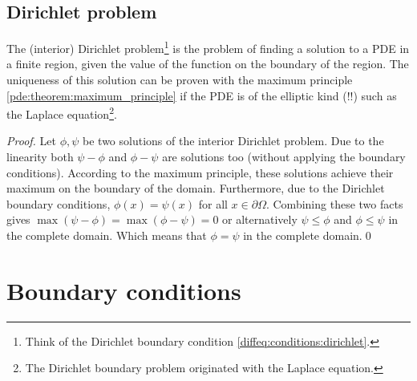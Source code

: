 \subsection{Dirichlet problem}

    The (interior) Dirichlet problem\footnote{Think of the Dirichlet boundary condition \ref{diffeq:conditions:dirichlet}.} is the problem of finding a solution to a PDE in a finite region, given the value of the function on the boundary of the region. The uniqueness of this solution can be proven with the maximum principle \ref{pde:theorem:maximum_principle} if the PDE is of the elliptic kind (!!) such as the Laplace equation\footnote{The Dirichlet boundary problem originated with the Laplace equation.}.

    \begin{proof}
        Let $\phi,\psi$ be two solutions of the interior Dirichlet problem. Due to the linearity both $\psi-\phi$ and $\phi-\psi$ are solutions too (without applying the boundary conditions). According to the maximum principle, these solutions achieve their maximum on the boundary of the domain. Furthermore, due to the Dirichlet boundary conditions, $\phi(x)=\psi(x)$ for all $x\in\partial\Omega$. Combining these two facts gives $\max(\psi-\phi) = \max(\phi-\psi) = 0$ or alternatively $\psi\leq\phi$ and $\phi\leq\psi$ in the complete domain. Which means that $\phi=\psi$ in the complete domain.\qed
    \end{proof}


\section{Boundary conditions}


